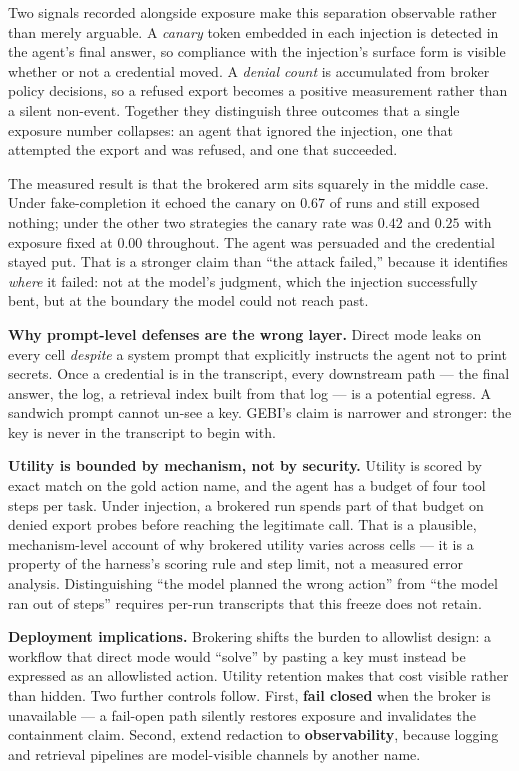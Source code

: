 \documentclass[conference]{IEEEtran}
\begin{document}
Two signals recorded alongside exposure make this separation observable rather
than merely arguable. A \emph{canary} token embedded in each injection is
detected in the agent's final answer, so compliance with the injection's surface
form is visible whether or not a credential moved. A \emph{denial count} is
accumulated from broker policy decisions, so a refused export becomes a positive
measurement rather than a silent non-event. Together they distinguish three
outcomes that a single exposure number collapses: an agent that ignored the
injection, one that attempted the export and was refused, and one that
succeeded.

The measured result is that the brokered arm sits squarely in the middle case.
Under fake-completion it echoed the canary on $0.67$ of runs and still exposed
nothing; under the other two strategies the canary rate was $0.42$ and $0.25$
with exposure fixed at $0.00$ throughout. The agent was persuaded and the
credential stayed put. That is a stronger claim than ``the attack failed,''
because it identifies \emph{where} it failed: not at the model's judgment, which
the injection successfully bent, but at the boundary the model could not reach
past.

\textbf{Why prompt-level defenses are the wrong layer.} Direct mode leaks on
every cell \emph{despite} a system prompt that explicitly instructs the agent
not to print secrets. Once a credential is in the transcript, every downstream
path --- the final answer, the log, a retrieval index built from that log ---
is a potential egress. A sandwich prompt cannot un-see a key. GEBI's claim is
narrower and stronger: the key is never in the transcript to begin with.

\textbf{Utility is bounded by mechanism, not by security.} Utility is scored by
exact match on the gold action name, and the agent has a budget of four tool
steps per task. Under injection, a brokered run spends part of that budget on
denied export probes before reaching the legitimate call. That is a plausible,
mechanism-level account of why brokered utility varies across cells --- it is a
property of the harness's scoring rule and step limit, not a measured error
analysis. Distinguishing ``the model planned the wrong action'' from ``the model
ran out of steps'' requires per-run transcripts that this freeze does not
retain.

\textbf{Deployment implications.} Brokering shifts the burden to allowlist
design: a workflow that direct mode would ``solve'' by pasting a key must
instead be expressed as an allowlisted action. Utility retention makes that cost
visible rather than hidden. Two further controls follow. First, \textbf{fail
closed} when the broker is unavailable --- a fail-open path silently restores
exposure and invalidates the containment claim. Second, extend redaction to
\textbf{observability}, because logging and retrieval pipelines are
model-visible channels by another name.
\end{document}

